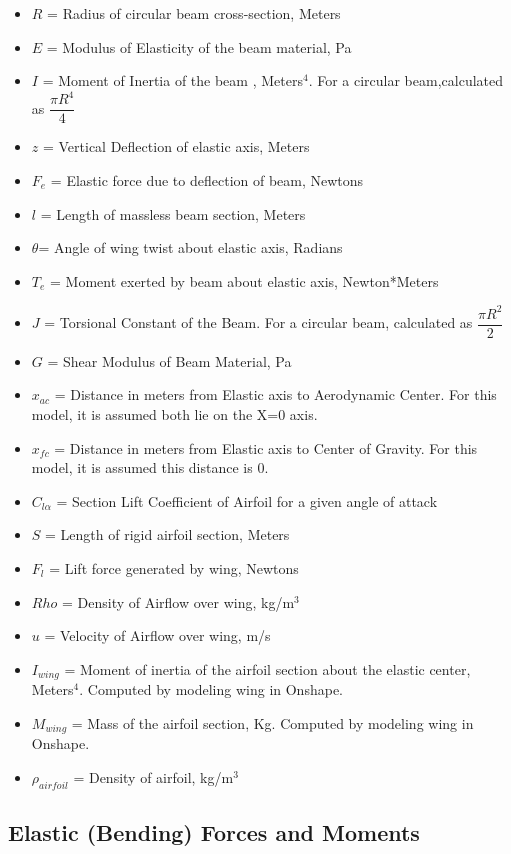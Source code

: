 \documentclass[]{article}
\begin{document}
\begin{itemize}
	
	\item $R$ = Radius of circular beam cross-section, Meters
	\item $E$ = Modulus of Elasticity of the beam material, Pa
	\item $I$ = Moment of Inertia of the beam , Meters$^4$. For a circular beam,calculated as $\dfrac{\pi R^4}{4}$
	\item $z$ = Vertical Deflection of elastic axis, Meters
	\item $F_e$ = Elastic force due to deflection of beam, Newtons
	\item $l$ = Length of massless beam section, Meters
	\item $\theta$= Angle of wing twist about elastic axis, Radians
	\item $T_e$ = Moment exerted by beam about elastic axis, Newton*Meters
	\item $J$ = Torsional Constant of the Beam. For a circular beam, calculated as $\dfrac{\pi R^2}{2}$
	\item $G$ = Shear Modulus of Beam Material, Pa
	\item $x_{ac}$ = Distance in meters from Elastic axis to Aerodynamic Center. For this model, it is assumed both lie on the X=0 axis.
	\item $x_{fc}$ = Distance in meters from Elastic axis to Center of Gravity. For this model, it is assumed this distance is 0.
	\item$C_{l\alpha}$ = Section Lift Coefficient of Airfoil for a given angle of attack
	\item$S$ = Length of rigid airfoil section, Meters
	\item$F_l$ = Lift force generated by wing, Newtons
	\item$Rho$ = Density of Airflow over wing, kg/m$^3$
	\item$u$ = Velocity of Airflow over wing, m/s
	\item$I_{wing}$ = Moment of inertia of the airfoil section about the elastic center, Meters$^4$. Computed by modeling wing in Onshape.
	\item$M_{wing}$ = Mass of the airfoil section, Kg. Computed by modeling wing in Onshape.
	\item$\rho_{airfoil}$ = Density of airfoil, kg/m$^3$
	
	
\end{itemize}

\subsection{Elastic (Bending) Forces and Moments}
\end{document}
